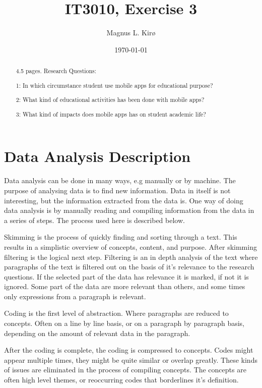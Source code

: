 \documentclass[12pt, a4paper]{article}
\title{
IT3010, Exercise 3
}
\author{
	Magnus L. Kirø \\
}
\date{\today}
\begin{document}
\maketitle
{}

\begin{abstract}
4.5 pages. 
Research Questions:

1: In which circumstance student use mobile apps for educational purpose?

2: What kind of educational activities has been done with mobile apps?

3: What kind of impacts does mobile apps has on student academic life?
\end{abstract}

\section{Data Analysis Description} %

Data analysis can be done in many ways, e.g manually or by machine. The purpose
of analysing data is to find new information. Data in itself is not
interesting, but the information extracted from the data is. One way of doing
data analysis is by manually reading and compiling information from the data in
a series of steps. The process used here is described below. 

Skimming is the process of quickly finding and sorting through a text. This
results in a simplistic overview of concepts, content, and purpose. 
After skimming filtering is the logical next step. Filtering is an in depth
analysis of the text where paragraphs of the text is filtered out on the basis
of it's relevance to the research questions. If the selected part of the data
has relevance it is marked, if not it is ignored. Some part of the data are
more relevant than others, and some times only expressions from a paragraph is
relevant.   

Coding is the first level of abstraction. Where paragraphs are reduced to
concepts. Often on a line by line basis, or on a paragraph by paragraph basis,
depending on the amount of relevant data in the paragraph. 

After the coding is complete, the coding is compressed to concepts. Codes might
appear multiple times, they might be quite similar or overlap greatly. These
kinds of issues are eliminated in the process of compiling concepts. The
concepts are often high level themes, or reoccurring codes that borderlines
it's definition.     
\end{document}
